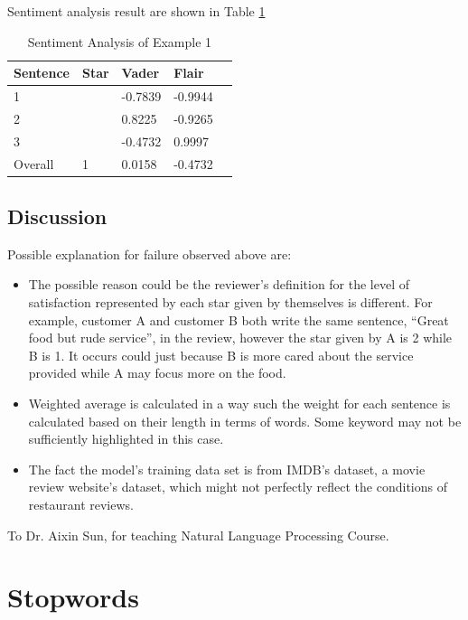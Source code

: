 \documentclass[sigconf]{acmart}
\begin{document}
Sentiment analysis result are shown in Table \ref{tab:eg2}
\begin{table}
  \caption{Sentiment Analysis of Example 1}
  \label{tab:eg2}
  \begin{tabular}{lllll}
    \toprule
    Sentence & Star & Vader & Flair \\
    \midrule
    1 & & -0.7839 & -0.9944\\
    2 & & 0.8225 & -0.9265\\
    3 & & -0.4732 & 0.9997\\
    \bottomrule
    Overall & 1 & 0.0158 & -0.4732\\
\end{tabular}
\end{table}

\subsection{Discussion} Possible explanation for failure observed above are:
\begin{itemize}
\item The possible reason could be the reviewer’s definition for the level of satisfaction represented by each star given by themselves is different. For example, customer A and customer B both write the same sentence, “Great food but rude service”, in the review, however the star given by A is 2 while B is 1. It occurs could just because B is more cared about the service provided while A may focus more on the food.
\item Weighted average is calculated in a way such the weight for each sentence is calculated based on their length in terms of words. Some keyword may not be sufficiently highlighted in this case.
\item The fact the model’s training data set is from IMDB’s dataset, a movie review website’s dataset, which might not perfectly reflect the conditions of restaurant reviews.
\end{itemize}

\begin{acks}
To Dr. Aixin Sun, for teaching Natural Language Processing Course.
\end{acks}




\appendix
\section{Stopwords}
\end{document}
